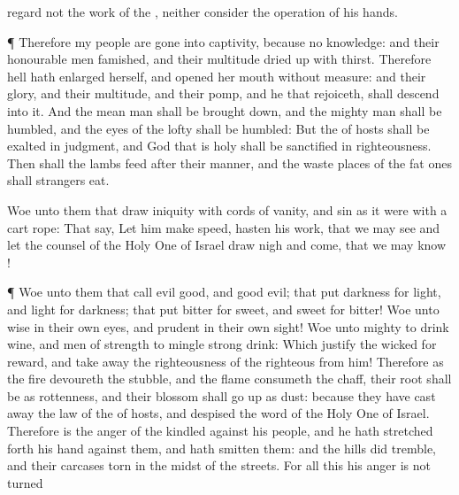 {regard not the
work of the
{}, neither
consider the
operation of his
hands.
\par }{\PP {}¶ Therefore my
people are gone into
captivity, because
{} no
knowledge: and their
honourable
men
{}
famished, and their
multitude dried
up with
thirst.
Therefore
hell hath
enlarged
herself, and
opened her
mouth without
measure: and their
glory, and their
multitude, and their
pomp, and he that
rejoiceth, shall
descend into it.
And the mean
man shall be brought
down, and the mighty
man shall be
humbled, and the
eyes of the
lofty shall be
humbled:
But the
{} of
hosts shall be
exalted in
judgment, and
God that is
holy shall be
sanctified in
righteousness.
Then shall the
lambs
feed after their
manner, and the waste
places of the fat
ones shall
strangers
eat.
\par }{\PP {}Woe unto them that
draw
iniquity with
cords of
vanity, and
sin as it were with a
cart
rope:
That
say, Let him make
speed,
{}
hasten his
work, that we may
see
{} and let the
counsel of the Holy
One of
Israel draw
nigh and
come, that we may
know
{}!
\par }{\PP {}¶
Woe unto them that
call
evil
good, and
good
evil; that
put
darkness for
light, and
light for
darkness; that
put
bitter for
sweet, and
sweet for
bitter!
Woe unto
{}
wise in their own
eyes, and
prudent in their own
sight!
Woe unto
{}
mighty to
drink
wine, and
men of
strength to
mingle strong
drink:
Which
justify the
wicked
for
reward, and take
away the
righteousness of the
righteous from him!
Therefore as the
fire
devoureth the
stubble, and the
flame
consumeth the
chaff,
{} their
root shall be as
rottenness, and their
blossom shall go
up as
dust: because they have cast
away the
law of the
{} of
hosts, and
despised the
word of the Holy
One of
Israel.
Therefore is the
anger of the
{}
kindled against his
people, and he hath stretched
forth his
hand against them, and hath
smitten them: and the
hills did
tremble, and their
carcases
{}
torn in the
midst of the
streets. For all this his
anger is not turned
}
